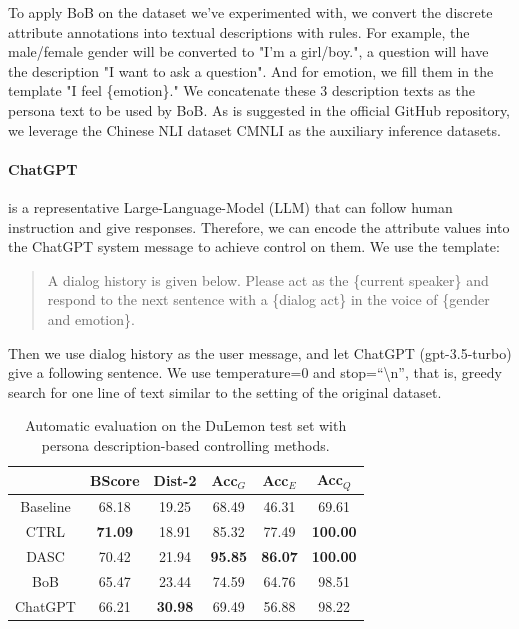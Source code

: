To apply BoB on the dataset we've experimented with, we convert the discrete attribute annotations into textual descriptions with rules. For example, the male/female gender will be converted to "I'm a girl/boy.", a question will have the description "I want to ask a question". And for emotion, we fill them in the template "I feel \{emotion\}." We concatenate these 3 description texts as the persona text to be used by BoB. As is suggested in the official GitHub repository, we leverage the Chinese NLI dataset CMNLI \citep{xu-etal-2020-clue} as the auxiliary inference datasets.

\paragraph{ChatGPT} \citep{openai2022:chatgpt} is a representative Large-Language-Model (LLM) that can follow human instruction and give responses. Therefore, we can encode the attribute values into the ChatGPT system message to achieve control on them. We use the template:

\begin{quote}
    A dialog history is given below. Please act as the \{current speaker\} and respond to the next sentence with a \{dialog act\} in the voice of \{gender and emotion\}.
\end{quote}

Then we use dialog history as the user message, and let ChatGPT (gpt-3.5-turbo) give a following sentence. We use temperature=0 and stop=``\textbackslash n'', that is, greedy search for one line of text similar to the setting of the original dataset. 


\begin{table}[h]
    \small
    \centering
    \begin{tabular}{cccccc}
    \hline
             & BScore         & Dist-2         & Acc$_G$         & Acc$_E$         & Acc$_Q$          \\ \hline
    Baseline & 68.18          & 19.25          & 68.49          & 46.31          & 69.61           \\
    CTRL     & \textbf{71.09} & 18.91          & 85.32          & 77.49          & \textbf{100.00} \\
    DASC     & 70.42          & 21.94          & \textbf{95.85} & \textbf{86.07} & \textbf{100.00} \\ \hline
    BoB      & 65.47          & 23.44          & 74.59          & 64.76          & 98.51           \\
    ChatGPT  & 66.21          & \textbf{30.98} & 69.49          & 56.88          & 98.22           \\ \hline
    \end{tabular}
    \caption{Automatic evaluation on the DuLemon test set with persona description-based controlling methods.}
    \label{tab:desc_control}
\end{table}

